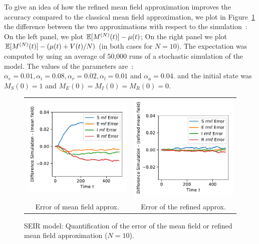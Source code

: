 \documentclass{sig-alternate-per}
\newcommand\MN{M^{(N)}}
\newcommand\esp[1]{{\mathchoice{\besp{#1}}{\sesp{#1}}{\sesp{#1}}{\sesp{#1}}}}
\newcommand\besp[1]{\mathbb{E}\left[#1\right]}
\newcommand\sesp[1]{\mathbb{E}[#1]}
\begin{document}
To give an idea of how the refined mean field approximation improves
the accuracy compared to the classical mean field approximation, we
plot in Figure~\ref{fig:diff} the difference between the two
approximations with respect to the simulation~: On the left panel, we
plot $\esp{\MN(t)}-\mu(t)$; On the right panel we plot
$\esp{\MN(t)}-(\mu(t)+V(t)/N)$ (in both cases for $N=10$). The
expectation was computed by using an average of 50,000 runs of a
stochastic simulation of the model.  The values of the parameters
are~: $\alpha_e=0.01, \alpha_i=0.08,\alpha_r=0.02,\alpha_l=0.01$ and
$\alpha_a=0.04$. and the initial state was $M_S(0)=1$ and
$M_E(0)=M_I(0)=M_R(0)=0$.
\begin{figure}[ht]
  \begin{center}
    \begin{tabular}{cc}
      \includegraphics[width=0.45\linewidth]{SEIR_errorMF_N10}
      &\includegraphics[width=0.45\linewidth]{SEIR_errorRMF_N10}\\
      Error of mean field approx.
      &
        Error of the refined approx.
    \end{tabular}\vspace{-.2cm}
  \end{center}
  \caption{\label{fig:diff} SEIR model: Quantification of the error of
    the mean field or refined mean field approximation ($N=10$).}
\end{figure}
\end{document}
